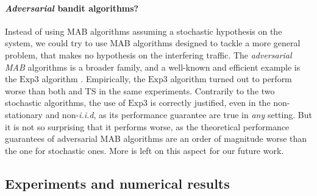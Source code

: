 \paragraph{\emph{Adversarial} bandit algorithms?}
Instead of using MAB algorithms assuming a stochastic hypothesis on the system, we could try to use MAB algorithms designed to tackle a more general problem, that makes no hypothesis on the interfering traffic.
The \emph{adversarial MAB} algorithms is a broader family, and a well-known and efficient example is the $\mathrm{Exp}3$ algorithm \cite{bubeck2012regret}.
Empirically, the $\mathrm{Exp}3$ algorithm turned out to perform worse than both \UCB{} and TS in the same experiments.
Contrarily to the two stochastic algorithms, the use of $\mathrm{Exp}3$ is correctly justified, even in the non-stationary and non-\emph{i.i.d}, as its performance guarantee are true in \emph{any} setting.
But it is not so surprising that it performs worse, as the theoretical performance guarantees of adversarial MAB algorithms are an order of magnitude
worse than the one for stochastic ones.
More is left on this aspect for our future work.



\subsection{Experiments and numerical results}\label{sub:41:numericalResults}


